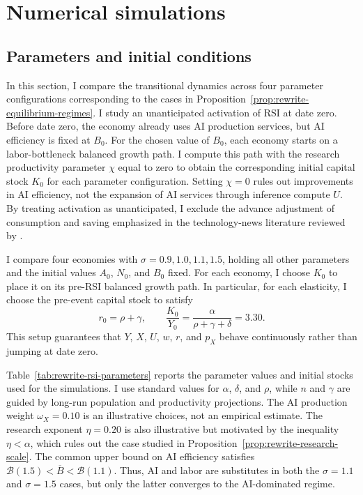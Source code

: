 \section{Numerical simulations}
\label{sec:rewrite-quantitative}

\subsection{Parameters and initial conditions}
\label{subsec:rewrite-rsi-activation}

In this section, I compare the transitional dynamics across four parameter configurations corresponding to the cases in Proposition~\ref{prop:rewrite-equilibrium-regimes}. I study an unanticipated activation of RSI at date zero. Before date zero, the economy already uses AI production services, but AI efficiency is fixed at $B_0$. For the chosen value of $B_0$, each economy starts on a labor-bottleneck balanced growth path. I compute this path with the research productivity parameter $\chi$ equal to zero to obtain the corresponding initial capital stock $K_0$ for each parameter configuration. Setting $\chi=0$ rules out improvements in AI efficiency, not the expansion of AI services through inference compute $U$. By treating activation as unanticipated, I exclude the advance adjustment of consumption and saving emphasized in the technology-news literature reviewed by \citet{beaudryportier2014}.

I compare four economies with $\sigma=0.9,1.0,1.1,1.5$, holding all other parameters and the initial values $A_0$, $N_0$, and $B_0$ fixed. For each economy, I choose $K_0$ to place it on its pre-RSI balanced growth path. In particular, for each elasticity, I choose the pre-event capital stock to satisfy
\begin{equation}
 r_0=\rho+\gamma,\qquad
 \frac{K_0}{Y_0}=\frac{\alpha}{\rho+\gamma+\delta}=3.30.
 \label{eq:rewrite-rsi-initial-ratio}
\end{equation}
This setup guarantees that $Y$, $X$, $U$, $w$, $r$, and $p_X$ behave continuously rather than jumping at date zero.

Table~\ref{tab:rewrite-rsi-parameters} reports the parameter values and initial stocks used for the simulations. I use standard values for $\alpha$, $\delta$, and $\rho$, while $n$ and $\gamma$ are guided by long-run population and productivity projections. The AI production weight $\omega_X=0.10$  is an illustrative choices, not an empirical estimate. The research exponent $\eta=0.20$ is also illustrative but motivated by the inequality $\eta<\alpha$, which rules out the case studied in Proposition~\ref{prop:rewrite-research-scale}. The common upper bound on AI efficiency satisfies $\mathcal B(1.5)<\overline B<\mathcal B(1.1)$. Thus, AI and labor are substitutes in both the $\sigma=1.1$ and $\sigma=1.5$ cases, but only the latter converges to the AI-dominated regime.

